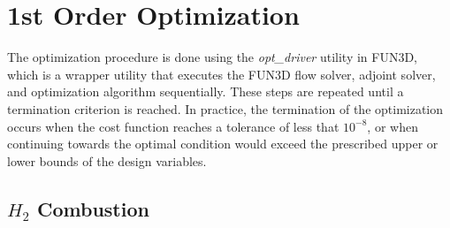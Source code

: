\section{1st Order Optimization}

The optimization procedure is done using the \textit{opt\_driver} utility in
FUN3D, which is a wrapper utility that executes the FUN3D flow solver, adjoint
solver, and optimization algorithm sequentially.  These steps are repeated until
a termination criterion is reached.  In practice, the termination of the
optimization occurs when the cost function reaches a tolerance of less that
$10^{-8}$, or when continuing towards the optimal condition would exceed the
prescribed upper or lower bounds of the design variables.

\subsection{$H_2$ Combustion}

